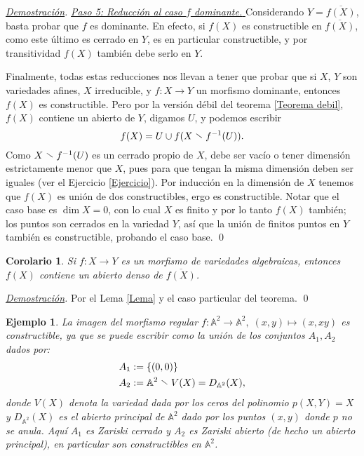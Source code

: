\documentclass[12pt]{article}
\theoremstyle{customTheorem}
\newtheorem{corollary}[theorem]{Corolario}
\theoremstyle{customDefinition}
\newtheorem{example}[theorem]{Ejemplo}
\renewenvironment{proof}[1][Demostración]{\noindent \textit{\underline{#1}.\hspace{2mm}}}{\hfill\qed}
\newcommand{\afine}[1]{\mathbb{A}^{#1}}
\renewcommand{\setminus}{\mathrel{\stackon[0.5pt]{}{$\smallsetminus$}}}
\renewcommand{\bar}[1]{\overline{#1}}
\begin{document}
\begin{proof}
    \underline{\textit{Paso 5: Reducción al caso $f$ dominante. }} Considerando $Y = \bar {f(X)}$, basta probar que $f$ es dominante. En efecto, si $f(X)$ es constructible en $\bar {f(X)}$, como este último es cerrado en $Y$, es en particular constructible, y por transitividad $f(X)$ también debe serlo en $Y$.

    \bigskip

    Finalmente, todas estas reducciones nos llevan a tener que probar que si $X$, $Y$ son variedades afines, $X$ irreducible, y $f : X \to Y$ un morfismo dominante, entonces $f(X)$ es constructible. Pero por la versión débil del teorema \ref{Teorema debil}, $f(X)$ contiene un abierto de $Y$, digamos $U$, y podemos escribir
    \[
    f(X) = U \cup f(X\setminus f^{-1} (U)).
    \]
    Como $X \setminus f^{-1} (U)$ es un cerrado propio de $X$, debe ser vacío o tener dimensión estrictamente menor que $X$, pues para que tengan la misma dimensión deben ser iguales (ver el Ejercicio \ref{Ejercicio}). Por inducción en la dimensión de $X$ tenemos que $f(X)$ es unión de dos constructibles, ergo es constructible. Notar que el caso base es $\dim X = 0$, con lo cual $X$ es finito y por lo tanto $f(X)$ también; los puntos son cerrados en la variedad $Y$, así que la unión de finitos puntos en $Y$ también es constructible, probando el caso base.
\end{proof}

\begin{corollary}\label{Corolario}
    Si $f : X \to Y$ es un morfismo de variedades algebraicas, entonces $f(X)$ contiene un abierto denso de $\bar {f(X)}$.
\end{corollary}
\begin{proof}
    Por el Lema \ref{Lema} y el caso particular del teorema.
\end{proof}

\begin{example}\label{Ejemplo}
    La imagen del morfismo regular $f:\mathbb{A}^2 \to \mathbb{A}^2,\;(x,y)\mapsto (x,xy)$ es constructible, ya que se puede escribir como la unión de los conjuntos $A_1, A_2$ dados por:
\begin{align*}
A_1 &:= \{(0,0)\} \\
A_2 &:= \afine 2 \setminus V (X) = D_{\afine 2} (X),
\end{align*}
donde $V(X)$ denota la variedad dada por los ceros del polinomio $p(X,Y) = X$ y $D_{\afine 2} (X)$ es el abierto principal de $\afine 2$ dado por los puntos $(x,y)$ donde $p$ no se anula. Aquí $A_1$ es Zariski cerrado y $A_2$ es Zariski abierto (de hecho un abierto principal), en particular son constructibles en $\mathbb{A}^2$.
\end{example}

\newpage


{}
\end{document}
